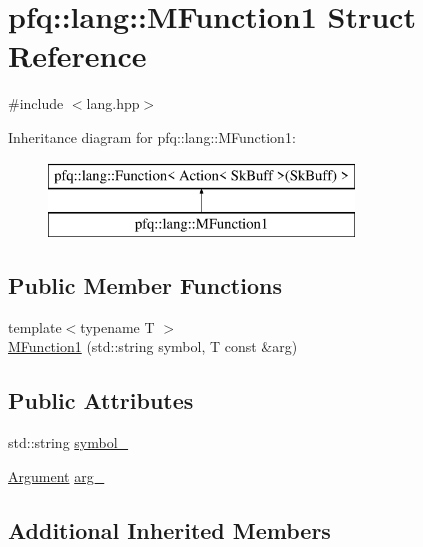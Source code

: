 \hypertarget{structpfq_1_1lang_1_1MFunction1}{\section{pfq\+:\+:lang\+:\+:M\+Function1 Struct Reference}
\label{structpfq_1_1lang_1_1MFunction1}
}


{\ttfamily \#include $<$lang.\+hpp$>$}

Inheritance diagram for pfq\+:\+:lang\+:\+:M\+Function1\+:\begin{figure}[H]
\begin{center}
\leavevmode
\includegraphics[height=2.000000cm]{structpfq_1_1lang_1_1MFunction1}
\end{center}
\end{figure}
\subsection*{Public Member Functions}
\begin{DoxyCompactItemize}
\item 
{\footnotesize template$<$typename T $>$ }\\\hyperlink{structpfq_1_1lang_1_1MFunction1_af8452ca9d81cebe841e9e40e34b6dcb4}{M\+Function1} (std\+::string symbol, T const \&arg)
\end{DoxyCompactItemize}
\subsection*{Public Attributes}
\begin{DoxyCompactItemize}
\item 
std\+::string \hyperlink{structpfq_1_1lang_1_1MFunction1_ad3caf902420e3f28b5d71a92f26222fb}{symbol\+\_\+}
\item 
\hyperlink{structpfq_1_1lang_1_1Argument}{Argument} \hyperlink{structpfq_1_1lang_1_1MFunction1_a5deb3265689b748ab9996b41a5e492a1}{arg\+\_\+}
\end{DoxyCompactItemize}
\subsection*{Additional Inherited Members}



